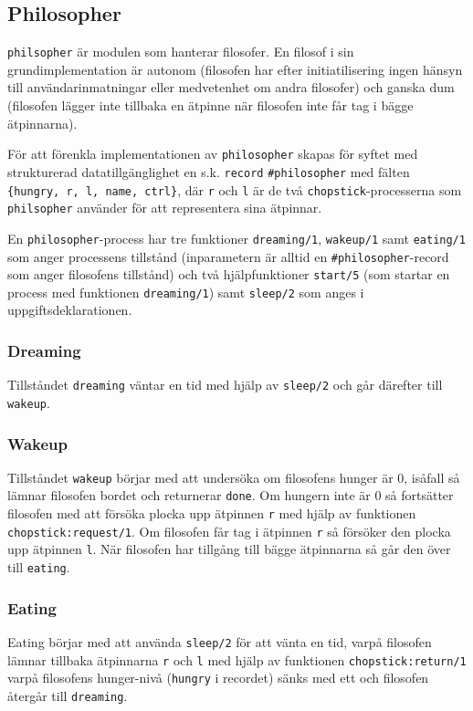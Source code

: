 \documentclass[a4paper, 11pt]{article}
\begin{document}
\subsection{Philosopher}
\label{subsec:philosopher}
\texttt{philsopher} är modulen som hanterar filosofer. En filosof i sin grundimplementation är autonom (filosofen har efter initiatilisering ingen hänsyn till användarinmatningar eller medvetenhet om andra filosofer) och ganska dum (filosofen lägger inte tillbaka en ätpinne när filosofen inte får tag i bägge ätpinnarna).

För att förenkla implementationen av \texttt{philosopher} skapas för syftet med strukturerad datatillgänglighet en s.k. \texttt{record} \texttt{\#philosopher} med fälten \\\lstinline${hungry, r, l, name, ctrl}$, där \texttt{r} och \texttt{l} är de två \texttt{chopstick}-processerna som \texttt{philsopher} använder för att representera sina ätpinnar.

En \texttt{philosopher}-process har tre funktioner \texttt{dreaming/1}, \texttt{wakeup/1} samt \texttt{eating/1} som anger processens tillstånd (inparametern är alltid en \texttt{\#philosopher}-record som anger filosofens tillstånd) och två hjälpfunktioner \texttt{start/5} (som startar en process med funktionen \texttt{dreaming/1}) samt \texttt{sleep/2} som anges i uppgiftsdeklarationen.

\subsubsection{Dreaming}
Tillståndet \texttt{dreaming} väntar en tid med hjälp av \texttt{sleep/2} och går därefter till \texttt{wakeup}.

\subsubsection{Wakeup}
Tillståndet \texttt{wakeup} börjar med att undersöka om filosofens hunger är 0, isåfall så lämnar filosofen bordet och returnerar \texttt{done}. Om hungern inte är 0 så fortsätter filosofen med att försöka plocka upp ätpinnen \texttt{r} med hjälp av funktionen \texttt{chopstick:request/1}. Om filosofen får tag i ätpinnen \texttt{r} så försöker den plocka upp ätpinnen \texttt{l}. När filosofen har tillgång till bägge ätpinnarna så går den över till \texttt{eating}.

\subsubsection{Eating}
Eating börjar med att använda \texttt{sleep/2} för att vänta en tid, varpå filosofen lämnar tillbaka ätpinnarna \texttt{r} och \texttt{l} med hjälp av funktionen \texttt{chopstick:return/1} varpå filosofens hunger-nivå (\texttt{hungry} i recordet) sänks med ett och filosofen återgår till \texttt{dreaming}.
\end{document}

